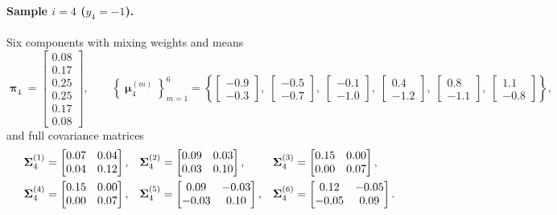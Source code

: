 \documentclass[11pt, letterpaper]{article}
\newcommand{\bSigma}{\vb{\Sigma}}
\newcommand{\bpi}{\boldsymbol{\uppi}}
\newcommand{\bmu}{\boldsymbol{\upmu}}
\begin{document}
\paragraph{Sample $i = 4$ ($y_4 = -1$).} Six components with mixing weights and means
\begin{equation}
    \bpi_4 = \begin{bmatrix} 0.08 \\ 0.17 \\ 0.25 \\ 0.25 \\ 0.17 \\ 0.08 \end{bmatrix},
    \qquad
    \left\{\bmu_4^{(m)}\right\}_{m=1}^{6} =
    \left\{
        \begin{bmatrix} -0.9 \\ -0.3 \end{bmatrix},\;
        \begin{bmatrix} -0.5 \\ -0.7 \end{bmatrix},\;
        \begin{bmatrix} -0.1 \\ -1.0 \end{bmatrix},\;
        \begin{bmatrix}  0.4 \\ -1.2 \end{bmatrix},\;
        \begin{bmatrix}  0.8 \\ -1.1 \end{bmatrix},\;
        \begin{bmatrix}  1.1 \\ -0.8 \end{bmatrix}
    \right\},
\end{equation}
and full covariance matrices
\begin{align}
    \bSigma_4^{(1)} &= \begin{bmatrix} 0.07 & 0.04 \\ 0.04 & 0.12 \end{bmatrix}, &
    \bSigma_4^{(2)} &= \begin{bmatrix} 0.09 & 0.03 \\ 0.03 & 0.10 \end{bmatrix}, &
    \bSigma_4^{(3)} &= \begin{bmatrix} 0.15 & 0.00 \\ 0.00 & 0.07 \end{bmatrix}, \notag \\
    \bSigma_4^{(4)} &= \begin{bmatrix} 0.15 & 0.00 \\ 0.00 & 0.07 \end{bmatrix}, &
    \bSigma_4^{(5)} &= \begin{bmatrix} 0.09 & -0.03 \\ -0.03 & 0.10 \end{bmatrix}, &
    \bSigma_4^{(6)} &= \begin{bmatrix} 0.12 & -0.05 \\ -0.05 & 0.09 \end{bmatrix}.
\end{align}
\end{document}
